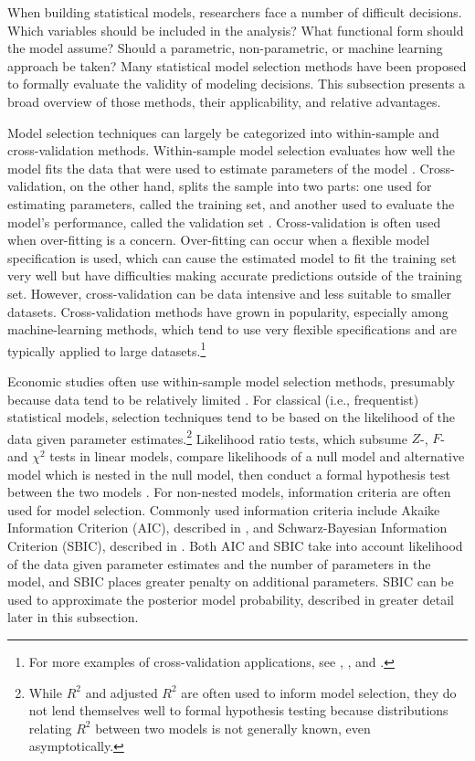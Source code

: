 \documentclass[twocolumn]{article}
\begin{document}
When building statistical models, researchers face a number of difficult decisions. Which variables should be included in the analysis? What functional form should the model assume? Should a parametric, non-parametric, or machine learning approach be taken? Many statistical model selection methods have been proposed to formally evaluate the validity of modeling decisions. This subsection presents a broad overview of those methods, their applicability, and relative advantages.

Model selection techniques can largely be categorized into within-sample and cross-validation methods. Within-sample model selection evaluates how well the model fits the data that were used to estimate parameters of the model \citep{Greene}. Cross-validation, on the other hand, splits the sample into two parts: one used for estimating parameters, called the training set, and another used to evaluate the model's performance, called the validation set \citep{Arlot}. Cross-validation is often used when over-fitting is a concern. Over-fitting can occur when a flexible model specification is used, which can cause the estimated model to fit the training set very well but have difficulties making accurate predictions outside of the training set. However, cross-validation can be data intensive and less suitable to smaller datasets. Cross-validation methods have grown in popularity, especially among machine-learning methods, which tend to use very flexible specifications and are typically applied to large datasets.\footnote{For more examples of cross-validation applications, see \cite{Allen}, \cite{Golub}, and \cite{Kohavi}.}

Economic studies often use within-sample model selection methods, presumably because data tend to be relatively limited \citep{Greene}. For classical (i.e., frequentist) statistical models, selection techniques tend to be based on the likelihood of the data given parameter estimates.\footnote{While $R^2$ and adjusted $R^2$ are often used to inform model selection, they do not lend themselves well to formal hypothesis testing because distributions relating $R^2$ between two models is not generally known, even asymptotically.} Likelihood ratio tests, which subsume $Z$-, $F$- and $\chi^2$ tests in linear models, compare likelihoods of a null model and alternative model which is nested in the null model, then conduct a formal hypothesis test between the two models \citep{Morgan}. For non-nested models, information criteria are often used for model selection. Commonly used information criteria include Akaike Information Criterion (AIC), described in \cite{Akaike}, and Schwarz-Bayesian Information Criterion (SBIC), described in \cite{Schwarz}. Both AIC and SBIC take into account likelihood of the data given parameter estimates and the number of parameters in the model, and SBIC places greater penalty on additional parameters. SBIC can be used to approximate the posterior model probability, described in greater detail later in this subsection.
\end{document}
